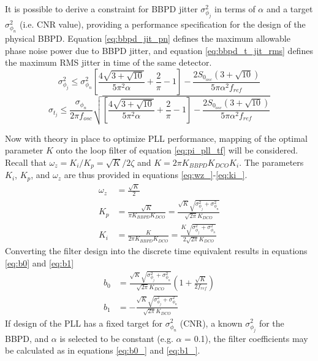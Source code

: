 			It is possible to derive a constraint for BBPD jitter $\sigma^2_{\phi_j}$ in terms of $\alpha$ and a target $\sigma^2_{\phi_n}$ (i.e. CNR value), providing a performance specification for the design of the physical BBPD. Equation \ref{eq:bbpd_jit_pn} defines the maximum allowable phase noise power due to BBPD jitter, and equation \ref{eq:bbpd_t_jit_rms} defines the maximum RMS jitter in time of the same detector. 
			\begin{equation}\label{eq:bbpd_jit_pn}
				\sigma^2_{\phi_j} \leq \sigma^2_{\phi_n}\left[\frac{4\sqrt{3+\sqrt{10}}}{5\pi^2\alpha} +\frac{2}{\pi} - 1 \right] - \frac{2S_{0_{osc}}(3 + \sqrt{10})}{5\pi\alpha^2f_{ref}}
			\end{equation}
			\begin{equation}\label{eq:bbpd_t_jit_rms}
				\sigma_{t_j} \leq \frac{\sigma_{\phi_n}}{2\pi f_{osc}}\sqrt{\left[\frac{4\sqrt{3+\sqrt{10}}}{5\pi^2\alpha} +\frac{2}{\pi} - 1 \right] - \frac{2S_{0_{osc}}(3 + \sqrt{10})}{5\pi\alpha^2f_{ref}}}
			\end{equation}

			Now with theory in place to optimize PLL performance, mapping of the optimal parameter $K$ onto the loop filter of equation \ref{eq:pi_pll_tf} will be considered. Recall that $\omega_z = K_i/K_p = \sqrt{K}/2\zeta$ and $K = 2\pi K_{BBPD}K_{DCO}K_{i}$. The parameters $K_i$, $K_p$, and $\omega_z$ are thus provided in equations \ref{eq:wz_}-\ref{eq:ki_}.
			\begin{align}
				\omega_z &= \frac{\sqrt{K}}{2}\label{eq:wz_}\\
				K_p &= \frac{\sqrt{K}}{\pi K_{BBPD}K_{DCO}} = \frac{\sqrt{K}\sqrt{\sigma^2_{\phi_j} + \sigma^2_{\phi_n}}}{\sqrt{2\pi}K_{DCO}}\\
				K_i &= \frac{K}{2\pi K_{BBPD}K_{DCO}} = \frac{K\sqrt{\sigma^2_{\phi_j} + \sigma^2_{\phi_n}}}{2\sqrt{2\pi}K_{DCO}}\label{eq:ki_}
			\end{align}
			Converting the filter design into the discrete time equivalent results in equations \ref{eq:b0} and \ref{eq:b1}
			\begin{align}
				b_0 &= \frac{\sqrt{K}\sqrt{\sigma^2_{\phi_j} + \sigma^2_{\phi_n}}}{\sqrt{2\pi}K_{DCO}}\left(1+\frac{\sqrt{K}}{2f_{ref}}\right)\label{eq:b0}\\
				 b_1 &=  - \frac{\sqrt{K}\sqrt{\sigma^2_{\phi_j} + \sigma^2_{\phi_n}}}{\sqrt{2\pi}K_{DCO}}\label{eq:b1}
			\end{align}
			If design of the PLL has a fixed target for $\sigma^2_{\phi_n}$ (CNR), a known $\sigma^2_{\phi_j}$ for the BBPD, and $\alpha$ is selected to be constant (e.g. $\alpha$ = 0.1), the filter coefficients may be calculated as in equations \ref{eq:b0_} and \ref{eq:b1_}.

